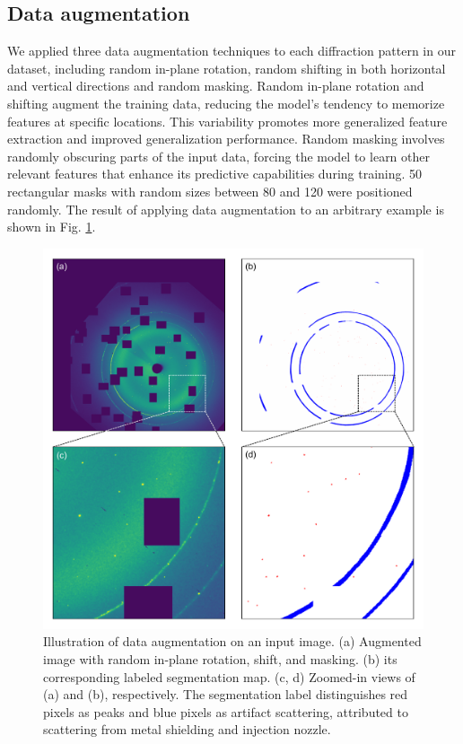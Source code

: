 \documentclass[a4paper]{article}
\begin{document}
\subsection{Data augmentation}

We applied three data augmentation techniques to each diffraction pattern in our dataset, including random in-plane rotation, random shifting in both horizontal and vertical directions and random masking.  Random in-plane rotation and shifting augment the training data, reducing the model's tendency to memorize features at specific locations.  This variability promotes more generalized feature extraction and improved generalization performance.  Random masking involves randomly obscuring parts of the input data, forcing the model to learn other relevant features that enhance its predictive capabilities during training. 50 rectangular masks with random sizes between 80 and 120 were positioned randomly. The result of applying data augmentation to an arbitrary example is shown in Fig. \ref{fig : data aug}.

\begin{figure}[!ht]
\includegraphics[width=\textwidth,keepaspectratio]
{./figures/data_aug.pdf}
\caption{Illustration of data augmentation on an input image. (a) Augmented
image with random in-plane rotation, shift, and masking. (b) its corresponding
labeled segmentation map. (c, d) Zoomed-in views of (a) and (b), respectively.
The segmentation label distinguishes red pixels as peaks and blue pixels as
artifact scattering, attributed to scattering from metal shielding and injection
nozzle.}
\label{fig : data aug}
\end{figure}
\end{document}
